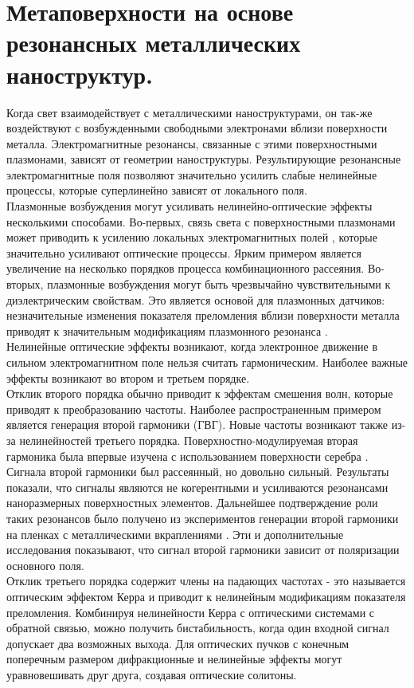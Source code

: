 \section{Метаповерхности на основе резонансных металлических наноструктур.}
\hspace*{2mm}
Когда свет взаимодействует с металлическими наноструктурами, он  так-же  воздействуют с возбужденными свободными электронами вблизи поверхности металла. Электромагнитные резонансы, связанные с этими поверхностными плазмонами, зависят от геометрии наноструктуры. Результирующие резонансные электромагнитные поля позволяют значительно усилить слабые нелинейные процессы, которые суперлинейно зависят от локального поля.
\\
\hspace*{2mm}
Плазмонные возбуждения могут усиливать нелинейно-оптические эффекты несколькими способами. Во-первых, связь света с поверхностными плазмонами может приводить к усилению локальных электромагнитных полей \cite{novotny2011antennas}, которые значительно усиливают оптические процессы. Ярким примером является увеличение на несколько порядков процесса  комбинационного рассеяния. Во-вторых, плазмонные возбуждения могут быть чрезвычайно чувствительными к диэлектрическим свойствам. Это является основой для плазмонных датчиков: незначительные изменения показателя преломления вблизи поверхности металла приводят к значительным модификациям плазмонного резонанса \cite{homola2008surface}.
\\
\hspace*{2mm}
Нелинейные оптические эффекты возникают, когда электронное движение в сильном электромагнитном поле нельзя считать гармоническим. Наиболее важные эффекты возникают во втором и третьем порядке. 
\\
Отклик второго порядка обычно приводит к эффектам смешения волн, которые приводят к преобразованию частоты. Наиболее распространенным примером является генерация второй гармоники (ГВГ). Новые частоты возникают также из-за нелинейностей третьего порядка. Поверхностно-модулируемая вторая гармоника была впервые изучена с использованием поверхности серебра \cite{chen1981surface}. Сигнала второй гармоники был рассеянный, но довольно сильный. Результаты показали, что сигналы являются не когерентными и усиливаются резонансами наноразмерных поверхностных элементов. Дальнейшее подтверждение роли таких резонансов было получено из экспериментов генерации второй гармоники на пленках с металлическими вкраплениями \cite{wokaun1981surface}. Эти и дополнительные исследования показывают, что сигнал второй гармоники зависит от поляризации основного поля.
\\
Отклик третьего порядка содержит члены на падающих частотах - это называется оптическим эффектом Керра и приводит к нелинейным модификациям показателя преломления. Комбинируя нелинейности Керра с оптическими системами с обратной связью, можно получить бистабильность, когда один входной сигнал допускает два возможных выхода. Для оптических пучков с конечным поперечным размером дифракционные и нелинейные эффекты могут уравновешивать друг друга, создавая оптические солитоны.

